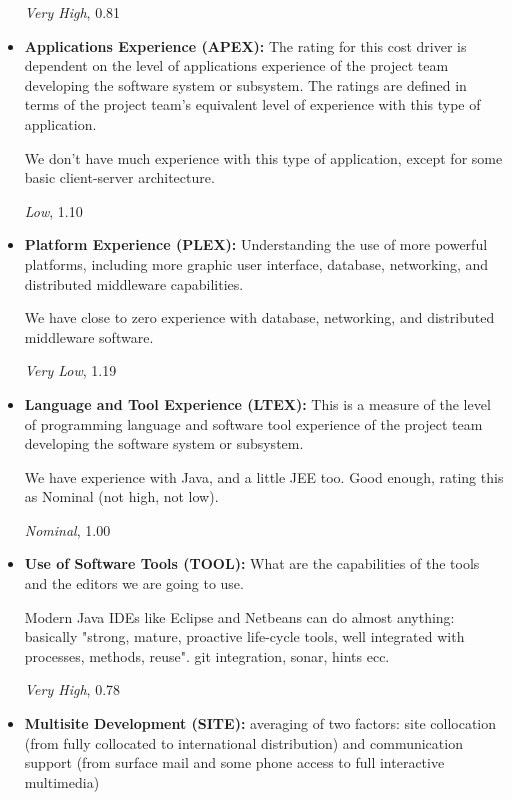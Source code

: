 \documentclass[english]{article}
\begin{document}
\begin{itemize}
\textit{Very High}, 0.81


\item \textbf{Applications Experience (APEX):} The rating for this cost driver is dependent on the level of applications experience of the project team developing the software system or subsystem. The ratings are defined in terms of the project team’s equivalent level of experience with this type of application.

We don't have much experience with this type of application, except for some basic client-server architecture.

\textit{Low}, 1.10


\item \textbf{Platform Experience (PLEX):} Understanding the use of more powerful platforms, including more graphic user interface, database, networking, and distributed middleware capabilities.

We have close to zero experience with database, networking, and distributed middleware software.

\textit{Very Low}, 1.19


\item \textbf{Language and Tool Experience (LTEX):} This is a measure of the level of programming language and software tool experience of the project team developing the software system or subsystem.

We have experience with Java, and a little JEE too. Good enough, rating this as Nominal (not high, not low).

\textit{Nominal}, 1.00


\item \textbf{Use of Software Tools (TOOL):} What are the capabilities of the tools and the editors we are going to use.

Modern Java IDEs like Eclipse and Netbeans can do almost anything: basically "strong, mature, proactive life-cycle tools, well integrated with processes, methods, reuse". 
git integration, sonar, hints ecc.

\textit{Very High}, 0.78


\item \textbf{Multisite Development (SITE):} averaging of two factors: site collocation (from fully collocated to international distribution) and communication support (from surface mail and some phone access to full interactive multimedia)


\end{itemize}
\end{document}
